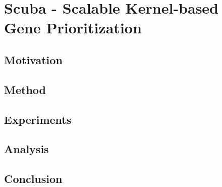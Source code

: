 \chapter{Scuba - Scalable Kernel-based Gene Prioritization}
\section{Motivation}
\section{Method}
\section{Experiments}
\section{Analysis}
\section{Conclusion}